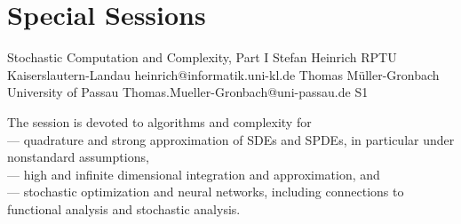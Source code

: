 \chapter{Special Sessions}

\begin{session}
 {Stochastic Computation and Complexity, Part I}%
 {Stefan Heinrich}%
 {RPTU Kaiserslautern-Landau}%
 {heinrich@informatik.uni-kl.de}%
 {Thomas M\"uller-Gronbach}%
 {University of Passau}%
 {Thomas.Mueller-Gronbach@uni-passau.de}%
 {S1}%
 {}%

 The session is devoted to algorithms and complexity for\\
 --- quadrature and strong approximation of SDEs and SPDEs, in particular under nonstandard assumptions,\\
 --- high and infinite dimensional integration and approximation, and\\
 --- stochastic optimization and neural networks,
 including connections to functional analysis and stochastic analysis.
\end{session}



\clearpage

